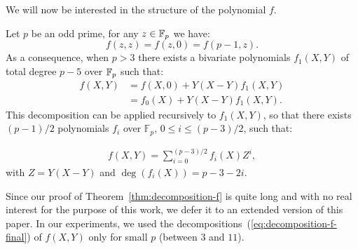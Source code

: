   We will now be interested in the structure of the polynomial $f$.

  \begin{theorem}\label{thm:decomposition-f}
    Let $p$ be an odd prime, for any $z\in\mathbb{F}_p$ we have:
    \begin{equation}
      \label{eq:3}
       f(z,z) = f(z,0) = f(p-1,z).
    \end{equation}
    As a consequence, when $p>3$ there exists a bivariate polynomials $f_1(X,Y)$ of total degree $p-5$ over $\mathbb{F}_p$ such that:
    \begin{align}
      \label{eq:dec-f}
      f(X,Y) &= f(X,0) + Y(X-Y)f_1(X,Y) \nonumber \\
      &= f_0(X) + Y(X-Y)f_1(X,Y).
    \end{align}   
    This decomposition can be applied recursively to $f_1(X,Y)$, so that there exists $(p-1)/2$ polynomials $f_i$ over $\mathbb{F}_p$, $0\leq i \leq (p-3)/2$, such that:

    \begin{align}\label{eq:decomposition-f-final}
      f(X,Y) = \sum_{i=0}^{(p-3)/2} f_i(X)Z^i,
    \end{align}
    with $Z=Y(X-Y)$ and $\deg (f_{i}(X)) = p-3 - 2i$.

  \end{theorem}  

  Since our proof of Theorem~\ref{thm:decomposition-f} is quite long and with no real interest for the purpose of this work, we defer it to an extended version of this paper. 
  In our experiments, we used the decompositions~(\ref{eq:decomposition-f-final}) of $f(X,Y)$ only for small $p$ (between $3$ and $11$).\newline
  



